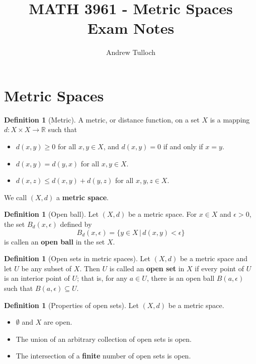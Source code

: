 \documentclass[10pt, oneside, reqno]{amsart}
\title{MATH 3961 - Metric Spaces \\ Exam Notes}								%
\author{Andrew Tulloch}
\theoremstyle{plain}%
\theoremstyle{definition}
\newtheorem{defn}[thm]{Definition}
\theoremstyle{remark}
\newcommand{\R}{\mathbb{R}}
\newcommand{\met}{(X,d)}
\begin{document}
\maketitle


\section{Metric Spaces} %
\label{sec:metric_spaces}

\begin{defn}[Metric]
	A metric, or distance function, on a set $X$ is a mapping $d : X \times X \rightarrow \R$ such that 
	\begin{itemize}
		\item $d(x,y) \geq 0$ for all $x,y \in X$, and $d(x,y) = 0$ if and only if $x = y$.
		\item $d(x,y) = d(y,x)$ for all $x,y \in X$.
		\item $d(x,z) \leq d(x,y) + d(y,z)$ for all $x,y,z \in X$.
	\end{itemize}
	
	We call $(X,d)$ a \textbf{metric space}.
\end{defn}

\begin{defn}[Open ball]
	Let $(X,d)$ be a metric space.  For $x \in X$ and $\epsilon > 0$, the set $B_d(x, \epsilon)$ defined by \[
		B_d(x,\epsilon) = \{ y \in X \, | \, d(x,y) < \epsilon \}
	\]
	is callen an \textbf{open ball} in the set $X$.  
\end{defn}

\begin{defn}[Open sets in metric spaces]
	Let $(X,d)$ be a metric space and let $U$ be any subset of $X$.  Then $U$ is called an \textbf{open set} in $X$ if every point of $U$ is an interior point of $U$; that is, for any $a \in U$, there is an open ball $B(a, \epsilon)$ such that $B(a, \epsilon) \subseteq U$.
\end{defn}

\begin{defn}[Properties of open sets]
	Let $\met$ be a metric space.
	\begin{itemize}
		\item $\emptyset$ and $X$ are open.
		\item The union of an arbitrary collection of open sets is open.
		\item The intersection of a \textbf{finite} number of open sets is open.
	\end{itemize}
\end{defn}
\end{document}

